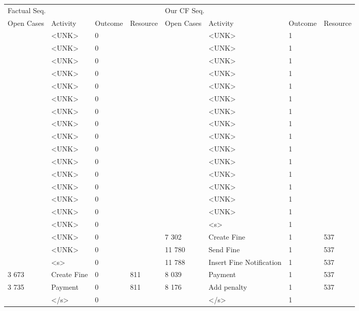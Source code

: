 \begin{tabular}{llllllll}
\toprule
\multicolumn{4}{l}{Factual Seq.} & \multicolumn{4}{l}{Our CF Seq.} \\
Open Cases & Activity & Outcome & Resource & Open Cases & Activity & Outcome & Resource \\
\midrule
 & <UNK> & 0 &  &  & <UNK> & 1 &  \\
 & <UNK> & 0 &  &  & <UNK> & 1 &  \\
 & <UNK> & 0 &  &  & <UNK> & 1 &  \\
 & <UNK> & 0 &  &  & <UNK> & 1 &  \\
 & <UNK> & 0 &  &  & <UNK> & 1 &  \\
 & <UNK> & 0 &  &  & <UNK> & 1 &  \\
 & <UNK> & 0 &  &  & <UNK> & 1 &  \\
 & <UNK> & 0 &  &  & <UNK> & 1 &  \\
 & <UNK> & 0 &  &  & <UNK> & 1 &  \\
 & <UNK> & 0 &  &  & <UNK> & 1 &  \\
 & <UNK> & 0 &  &  & <UNK> & 1 &  \\
 & <UNK> & 0 &  &  & <UNK> & 1 &  \\
 & <UNK> & 0 &  &  & <UNK> & 1 &  \\
 & <UNK> & 0 &  &  & <UNK> & 1 &  \\
 & <UNK> & 0 &  &  & <UNK> & 1 &  \\
 & <UNK> & 0 &  &  & <s> & 1 &  \\
 & <UNK> & 0 &  & 7 302 & Create Fine & 1 & 537 \\
 & <UNK> & 0 &  & 11 780 & Send Fine & 1 & 537 \\
 & <s> & 0 &  & 11 788 & Insert Fine Notification & 1 & 537 \\
3 673 & Create Fine & 0 & 811 & 8 039 & Payment & 1 & 537 \\
3 735 & Payment & 0 & 811 & 8 176 & Add penalty & 1 & 537 \\
 & </s> & 0 &  &  & </s> & 1 &  \\
\bottomrule
\end{tabular}

